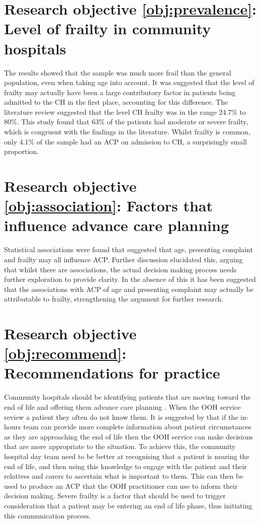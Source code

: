 \documentclass
[
	12pt,
	a4paper,
	oneside,
]{report}
\begin{document}
\section{Research objective \ref{obj:prevalence}: Level of frailty in
	community hospitals}

The results showed that the sample was much more frail than the general
population, even when taking age into account. It was suggested that the level
of frailty may actually have been a large contributory factor in patients
being admitted to the CH in the first place, accounting for this difference.
The literature review suggested that the level CH frailty was in the range 
24.7\% to 80\%. This study found that 63\% of the patients had moderate or
severe frailty, which is congruent with the findings in the literature. Whilst
frailty is common, only 4.1\% of the sample had an ACP on admission to CH, a
surprisingly small proportion.

\section{Research objective \ref{obj:association}: Factors that influence
advance care planning}

Statistical associations were found that suggested that age, presenting
complaint and frailty may all influence ACP. Further discussion elucidated
this, arguing that whilst there are associations, the actual decision
making process needs further exploration to provide clarity. In the absence of
this it has been suggested that the associations with ACP of age and 
presenting complaint may actually be attributable to frailty, strengthening
the argument for further research.

\section{Research objective \ref{obj:recommend}: Recommendations for practice}

Community hospitals should be identifying patients that are moving toward the
end of life and offering them advance care planning \parencite{dh:09}.
When the OOH service review a patient they often do not know them. It is 
suggested by \textcite{brettell:18} that if the in-hours team can provide more
complete information about patient circumstances as they are approaching the
end of life then the OOH service can make decisions that are more appropriate
to the situation. To achieve this, the community hospital day team need to be 
better at recognising that a patient is nearing the end of life, and then 
using this knowledge to engage with the patient and their relatives and 
carers to ascertain what is important to them. This can then be used to 
produce an ACP that the OOH practitioner can use to inform their decision
making. Severe frailty is a factor that should be used to trigger consideration
that a patient may be entering an end of life phase, thus initiating this
communication process.
\end{document}
